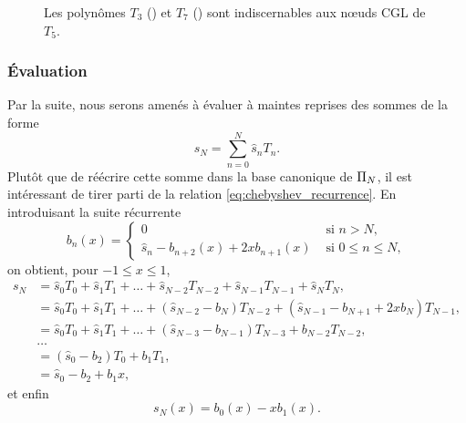 \begin{figure}
	\centering
	\caption{Les polynômes $T_3$ (\protect{}) et $T_7$ (\protect{}) sont indiscernables aux n\oe uds CGL de $T_5$.}
	\label{fig:aliasing_cgl}
\end{figure}


\subsubsection{Évaluation}
Par la suite, nous serons amenés à évaluer à maintes reprises des sommes de la forme
\begin{equation}
	s_N = \sum_{n=0}^N \hat{s}_n T_n.
	\label{eq:chebyshev_sum}
\end{equation}
Plutôt que de réécrire cette somme dans la base canonique de $\Pi_{N}$, il est intéressant de tirer parti de la relation \eqref{eq:chebyshev_recurrence}. 
En introduisant la suite récurrente
\begin{equation}
	b_n(x) = 
	\begin{cases}
	 0 & \text{\ si\ } n > N,   \\ 
	 \hat{s}_n - b_{n+2}(x) + 2x b_{n+1}(x) & \text{\ si\ } 0 \leq n \leq N,
	\end{cases}
\end{equation}
on obtient, pour $-1 \leq x \leq 1$,%
\def\px{}%
\begin{align*}
	s_N\px 
	&= \hat{s}_0 T_0\px + \hat{s}_1 T_1\px + \ldots + \hat{s}_{N-2} T_{N-2}\px + \hat{s}_{N-1} T_{N-1}\px + \hat{s}_N T_N\px, \\
	&= \hat{s}_0 T_0 \px
	+ \hat{s}_1 T_1 \px
	+ \ldots 
	+ \left(\hat{s}_{N-2} - b_{N}\px\right) T_{N-2} \px
	+ \left(\hat{s}_{N-1} - b_{N+1}\px + 2x b_{N}\px \right) T_{N-1}\px, \\
	&= \hat{s}_0 T_0 \px
	+ \hat{s}_1 T_1 \px
	+ \ldots 
	+ \left(\hat{s}_{N-3} - b_{N-1}\px\right) T_{N-3} \px
	+ b_{N-2}\px T_{N-2}\px, \\
	& \ldots\\
	&= \left( \hat{s}_0 - b_2\px \right) T_0\px + b_1\px T_1\px, \\
	&= \hat{s}_0 - b_2\px + b_1\px x,
\end{align*}
et enfin
\begin{equation}
	s_N(x) = b_0(x) - x b_1(x).
\end{equation}


